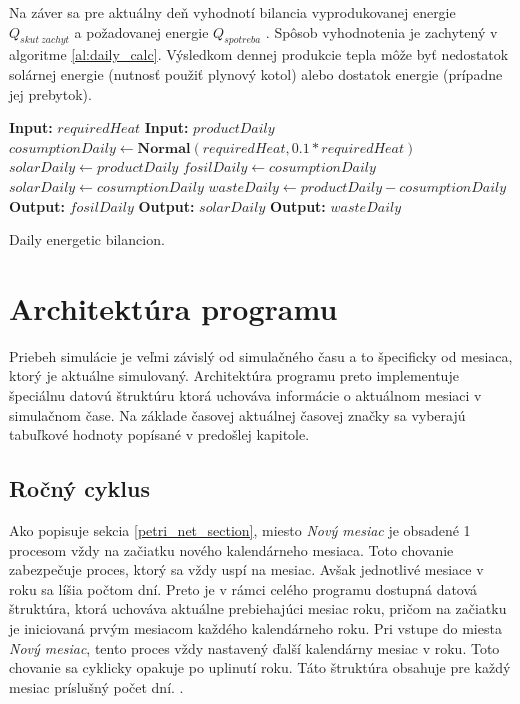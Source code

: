 \documentclass[a4paper, 11pt]{article}
\begin{document}
Na záver sa pre aktuálny deň vyhodnotí bilancia vyprodukovanej energie $Q_{skut\ zachyt}$ a požadovanej energie $Q_{spotreba}$ . Spôsob vyhodnotenia je zachytený v algoritme \ref{al:daily_calc}. Výsledkom dennej produkcie tepla môže byť nedostatok solárnej energie (nutnosť použiť plynový kotol) alebo dostatok energie (prípadne jej prebytok).

\begin{algorithm}[H]\label{al:daily_calc}
	\begin{algorithmic}
		\STATE\textbf{Input:} $requiredHeat$
		\STATE\textbf{Input:} $productDaily$
		\STATE$cosumptionDaily \gets \textbf{Normal}(requiredHeat, 0.1 * requiredHeat)$
		\STATE $solarDaily \gets productDaily$
		\STATE $fosilDaily \gets cosumptionDaily$
		\ELSE
		\STATE $solarDaily \gets cosumptionDaily$
		\STATE $wasteDaily \gets productDaily - cosumptionDaily$
		\ENDIF 
		\STATE\textbf{Output:} $fosilDaily$
		\STATE\textbf{Output:} $solarDaily$
		\STATE\textbf{Output:} $wasteDaily$
	\end{algorithmic}
	\caption{Daily energetic bilancion.}
\end{algorithm}



\section{Architektúra programu}

Priebeh simulácie je veľmi závislý od simulačného času a to špecificky od mesiaca, ktorý je aktuálne simulovaný. Architektúra programu preto implementuje špeciálnu datovú štruktúru ktorá uchováva informácie o aktuálnom mesiaci v simulačnom čase. Na základe časovej aktuálnej časovej značky sa vyberajú tabuľkové hodnoty popísané v predošlej kapitole.

\subsection{Ročný cyklus}
Ako popisuje sekcia \ref{petri_net_section}, miesto \textit{Nový mesiac} je obsadené 1 procesom vždy na začiatku nového kalendárneho mesiaca. Toto chovanie zabezpečuje proces, ktorý sa vždy uspí na mesiac. Avšak jednotlivé mesiace v roku sa líšia počtom dní. Preto je v rámci celého programu dostupná datová štruktúra, ktorá uchováva aktuálne prebiehajúci mesiac roku, pričom na začiatku je iniciovaná prvým mesiacom každého kalendárneho roku. Pri vstupe do miesta \textit{Nový mesiac}, tento proces vždy nastavený ďalší kalendárny mesiac v roku. Toto chovanie sa cyklicky opakuje po uplinutí roku. Táto štruktúra obsahuje pre každý mesiac príslušný počet dní. .
\end{document}
